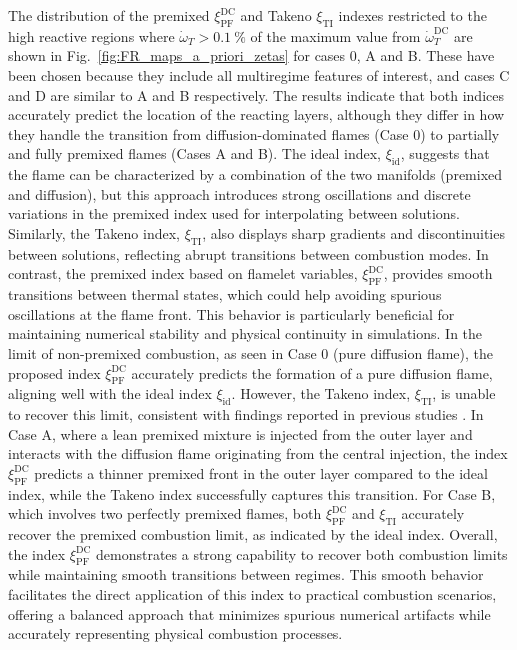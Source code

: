 \documentclass[preprint,12pt,authoryear]{elsarticle}
\begin{document}
{The distribution of the premixed $\xi_\mathrm{PF}^\mathrm{DC}$ and 
Takeno $\xi_\mathrm{TI}$ indexes restricted to the high reactive 
regions where $\dot{\omega}_T > 0.1~\% $ of the maximum value from $\dot{\omega}_{T}^\mathrm{DC}$ are shown 
in Fig.~\ref{fig:FR_maps_a_priori_zetas} for cases 0, A and B. These have been chosen because they include all multiregime features of interest, and cases C and D are similar to A and B respectively. The results indicate that both indices accurately predict the location of the reacting layers, although they differ in how they handle the transition from diffusion-dominated flames (Case 0) to partially and fully premixed flames (Cases A and B). The ideal index, $\xi_\mathrm{id}$, suggests that the flame can be characterized by a combination of the two manifolds (premixed and diffusion), but this approach introduces strong oscillations and discrete variations in the premixed index used for interpolating between solutions. Similarly, the Takeno index, $\xi_\mathrm{TI}$, also displays sharp gradients and discontinuities between solutions, reflecting abrupt transitions between combustion modes. In contrast, the premixed index based on flamelet variables, $\xi_\mathrm{PF}^\mathrm{DC}$, provides smooth transitions between thermal states, which could help avoiding spurious oscillations at the flame front. This behavior is particularly beneficial for maintaining numerical stability and physical continuity in simulations. In the limit of non-premixed combustion, as seen in Case 0 (pure diffusion flame), the proposed index $\xi_\mathrm{PF}^\mathrm{DC}$ accurately predicts the formation of a pure diffusion flame, aligning well with the ideal index $\xi_\mathrm{id}$. However, the Takeno index, $\xi_\mathrm{TI}$, is unable to recover this limit, consistent with findings reported in previous studies \citep{fiorina_approximating_2005,zirwes_identification_2021}. In Case A, where a lean premixed mixture is injected from the outer layer and interacts with the diffusion flame originating from the central injection, the index $\xi_\mathrm{PF}^\mathrm{DC}$ predicts a thinner premixed front in the outer layer compared to the ideal index, while the Takeno index successfully captures this transition. For Case B, which involves two perfectly premixed flames, both $\xi_\mathrm{PF}^\mathrm{DC}$ and $\xi_\mathrm{TI}$ accurately recover the premixed combustion limit, as indicated by the ideal index. Overall, the index $\xi_\mathrm{PF}^\mathrm{DC}$ demonstrates a strong capability to recover both combustion limits while maintaining smooth transitions between regimes. This smooth behavior facilitates the direct application of this index to practical combustion scenarios, offering a balanced approach that minimizes spurious numerical artifacts while accurately representing physical combustion processes.

}
\end{document}
